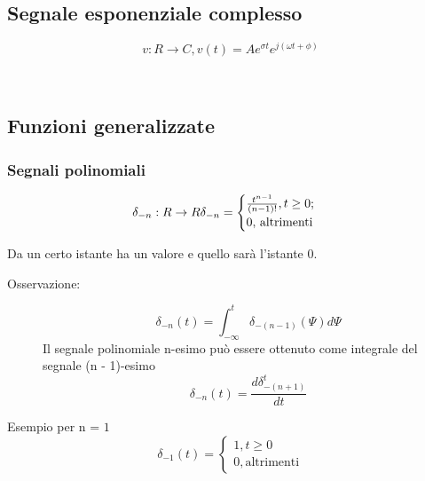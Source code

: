 \documentclass[a4paper, 12pt]{book}
\theoremstyle{plain}
\begin{document}
\subsection{Segnale esponenziale complesso}
\[
v : R \rightarrow C, v(t) = A e^{\sigma t} e^{j(\omega t + \phi)}
\]

\begin{figure}[h!]
    \centering
		\quad
		\\
\end{figure}

\subsection{Funzioni generalizzate}
\subsubsection{Segnali polinomiali}
\[
\delta_{-n} : R \rightarrow R \\
\delta_{-n} = \begin{cases}
    \frac{t^{n - 1}}{(n - 1)!}, t \ge 0;\\
    0 \textrm{, altrimenti}
\end{cases}    
\]

Da un certo istante ha un valore e quello sarà l'istante 0.
\begin{description}
    \item[Osservazione: ] \[
    \delta_{-n}(t) = \int_{-\infty}^t \delta_{-(n - 1)}(\Psi)d\Psi    
    \] 
    Il segnale polinomiale n-esimo può essere ottenuto come integrale del segnale (n - 1)-esimo
    \[
    \delta_{-n}(t) = \frac{d\delta_{-(n + 1)}^t}{dt}\]
\end{description}
Esempio per n = $1$
\[\delta_{-1}(t) = 
\begin{cases}
    1, t \ge 0\\
    0, \textrm{altrimenti}
\end{cases}    
\]
\end{document}
